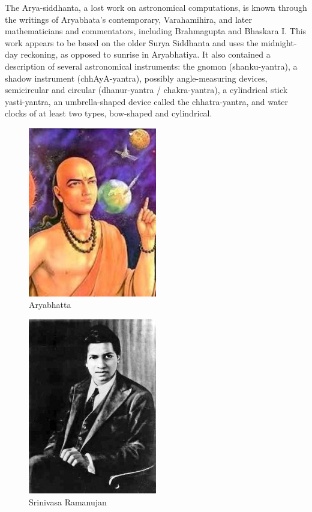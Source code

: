 \documentclass{article}
\begin{document}
The Arya-siddhanta, a lost work on astronomical computations, is known through the writings of Aryabhata's contemporary, Varahamihira, and later mathematicians and commentators, including Brahmagupta and Bhaskara I. This work appears to be based on the older Surya Siddhanta and uses the midnight-day reckoning, as opposed to sunrise in Aryabhatiya. It also contained a description of several astronomical instruments: the gnomon (shanku-yantra), a shadow instrument (chhAyA-yantra), possibly angle-measuring devices, semicircular and circular (dhanur-yantra / chakra-yantra), a cylindrical stick yasti-yantra, an umbrella-shaped device called the chhatra-yantra, and water clocks of at least two types, bow-shaped and cylindrical.\\
\begin{figure}
	\begin{center}
		
		\includegraphics[width=0.50\textwidth]{aryabhatta}
		\caption{Aryabhatta}
		\label{fig:aryabhatta}
		
	\end{center}
\end{figure}
\begin{figure}
	\begin{center}
		
		\includegraphics[width=0.50\textwidth]{Srinivasa}
		\caption{Srinivasa Ramanujan}
		\label{fig:ramanujan}
		
	\end{center}
\end{figure}
\end{document}
